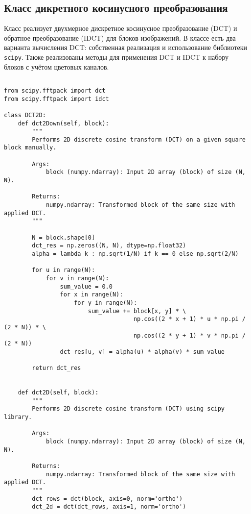\subsection{Класс дикретного косинусного преобразования}

Класс реализует двухмерное дискретное косинусное преобразование (DCT) и обратное преобразование 
(IDCT) для блоков изображений. 
В классе есть два варианта вычисления DCT: собственная реализация и использование библиотеки \texttt{scipy}.
 Также реализованы методы для применения DCT и IDCT к набору блоков с учётом цветовых каналов.

\begin{lstlisting}[caption={Класс двумерного дикретного косинусного преобразования}]

from scipy.fftpack import dct
from scipy.fftpack import idct

class DCT2D:
    def dct2Down(self, block):
        """
        Performs 2D discrete cosine transform (DCT) on a given square block manually.

        Args:
            block (numpy.ndarray): Input 2D array (block) of size (N, N).

        Returns:
            numpy.ndarray: Transformed block of the same size with applied DCT.
        """

        N = block.shape[0]
        dct_res = np.zeros((N, N), dtype=np.float32)
        alpha = lambda k : np.sqrt(1/N) if k == 0 else np.sqrt(2/N)

        for u in range(N):
            for v in range(N):
                sum_value = 0.0
                for x in range(N):
                    for y in range(N):
                        sum_value += block[x, y] * \
                                     np.cos((2 * x + 1) * u * np.pi / (2 * N)) * \
                                     np.cos((2 * y + 1) * v * np.pi / (2 * N))
                dct_res[u, v] = alpha(u) * alpha(v) * sum_value

        return dct_res
    

    def dct2D(self, block):
        """
        Performs 2D discrete cosine transform (DCT) using scipy library.

        Args:
            block (numpy.ndarray): Input 2D array (block) of size (N, N).

        Returns:
            numpy.ndarray: Transformed block of the same size with applied DCT.
        """
        dct_rows = dct(block, axis=0, norm='ortho')
        dct_2d = dct(dct_rows, axis=1, norm='ortho')


\end{lstlisting}
